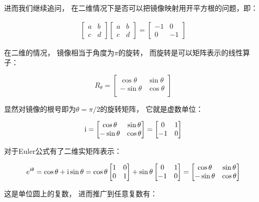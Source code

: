 \documentclass[10pt, openany]{book}
\begin{document}
进而我们继续追问，
在二维情况下是否可以把镜像映射用开平方根的问题，即：

$$
\begin{aligned}
\begin{bmatrix}a & b\\c & d\end{bmatrix}
\begin{bmatrix}a & b\\c & d\end{bmatrix}
= \begin{bmatrix}-1 & 0\\0 & -1\end{bmatrix}
\end{aligned}
$$

在二维的情况，
镜像相当于角度为$\pi$的旋转，
而旋转是可以矩阵表示的线性算子：

$$
R_\theta = \begin{bmatrix}
\cos \theta & \sin \theta \\
-\sin \theta & \cos \theta \\
\end{bmatrix}
$$

显然对镜像的根号即为$\theta = \pi/2$的旋转矩阵，
它就是虚数单位：

$$
\text i
=\begin{bmatrix}
\cos \theta & \sin \theta \\
-\sin \theta & \cos \theta \\
\end{bmatrix}
=\begin{bmatrix}
0 & 1 \\
-1 & 0 \\
\end{bmatrix}
$$

对于Euler公式有了二维实矩阵表示：

$$
e^{\text i\theta} = \cos \theta + \text i\sin \theta 
=\cos \theta\begin{bmatrix}1&0\\0&1\end{bmatrix}
+\sin \theta\begin{bmatrix}0&1\\-1&0\end{bmatrix}
=\begin{bmatrix}
\cos \theta & \sin \theta \\
-\sin \theta & \cos \theta \\
\end{bmatrix}
$$

这是单位圆上的复数，
进而推广到任意复数有：
\end{document}
